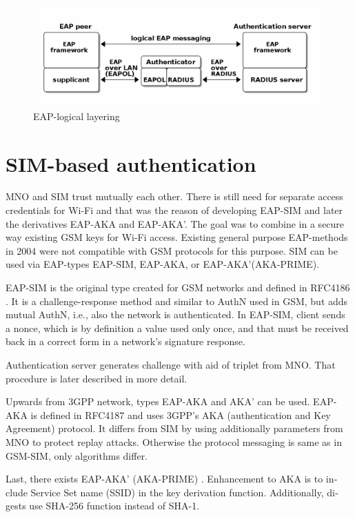 \documentclass[12pt,a4paper,english]{tutthesis}
\begin{document}
\begin{otherlanguage}{english}
\begin{figure}[htb]
\centering
\includegraphics[width=.9\linewidth]{eap-layer.png}
\caption{\label{fig:eap-layers}EAP-logical layering}
\end{figure}






\section{SIM-based authentication}
\label{sec-2-5}
\label{sec:sim-based-auth}
MNO and SIM trust mutually each other.
There is still need for separate access credentials for Wi-Fi and
that was the reason of developing EAP-SIM and later the derivatives
EAP-AKA and EAP-AKA'.
The goal was to combine in a secure way existing GSM keys for Wi-Fi
access. Existing general purpose EAP-methods in 2004 were not
compatible with GSM protocols for this purpose. \cite[p.93]{hav-doc}
SIM can be used via EAP-types EAP-SIM,
EAP-AKA, or EAP-AKA'(AKA-PRIME).

EAP-SIM is the original type created for GSM networks and defined 
in RFC4186 \cite{rfc4186}.
It is a challenge-response method and similar to AuthN used in GSM, 
but adds mutual AuthN, i.e., also the network is authenticated.
In EAP-SIM, client sends a nonce, which is by definition a
value used only once, and that must be received back
in a correct form in a network's signature response. 

Authentication server generates challenge with aid of
triplet from MNO.
That procedure is later described in more detail.

Upwards from 3GPP network, types EAP-AKA and AKA' can be used.
EAP-AKA is defined in RFC4187 \cite{rfc4187} and
 uses 3GPP's AKA (authentication and Key Agreement) protocol.
It differs from SIM by using additionally parameters from MNO to
protect replay attacks. Otherwise the protocol messaging is same
as in  GSM-SIM, only algorithms differ.


Last, there exists EAP-AKA' (AKA-PRIME) \cite{rfc5448}.
Enhancement to AKA is to include Service Set name (SSID) 
in the key derivation function. Additionally, digests use SHA-256
function instead of SHA-1.



\end{otherlanguage}
\end{document}
